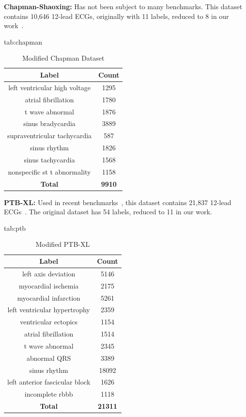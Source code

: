 \documentclass[pmlr,twocolumn]{jmlr}%
\begin{document}
\textbf{Chapman-Shaoxing:} Has not been subject to many benchmarks. This dataset contains 10,646 12-lead ECGs, originally with 11 labels, reduced to 8 in our work~\citep{zheng202012}.
\begin{table}[htbp]
\floatconts
  {tab:chapman}%
  {\caption{Modified Chapman Dataset}}%
  {
    \begin{tabular}{|c|c|}
     \hline
    Label & Count \\
     \hline
    left ventricular high voltage &  1295 \\
    atrial fibrillation           &  1780 \\
    t wave abnormal               &  1876 \\
    sinus bradycardia             &  3889 \\
    supraventricular tachycardia  &   587 \\
    sinus rhythm                  &  1826 \\
    sinus tachycardia             &  1568 \\
    nonspecific st t abnormality  &  1158 \\
     \hline
    \textbf{Total} & \textbf{9910}\\
    \hline
    \end{tabular}
  }
\end{table}

\textbf{PTB-XL:} Used in recent benchmarks~\citep{strodthoff2020deep}, this dataset contains 21,837 12-lead ECGs~\citep{wagner2020ptb}. The original dataset has 54 labels, reduced to 11 in our work. 
\begin{table}[htbp]

\floatconts
  {tab:ptb}%
  {\caption{Modified PTB-XL}}%
  {
    \begin{tabular}{|c|c|}
     \hline
    Label & Count \\
     \hline
        left axis deviation                  &   5146 \\
        myocardial ischemia                  &   2175 \\
        myocardial infarction                &   5261 \\
        left ventricular hypertrophy         &   2359 \\
        ventricular ectopics                 &   1154 \\
        atrial fibrillation                  &   1514 \\
        t wave abnormal                      &   2345 \\
        abnormal QRS                         &   3389 \\
        sinus rhythm                         &  18092 \\
        left anterior fascicular block       &   1626 \\
        incomplete rbbb &   1118 \\
     \hline
    \textbf{Total} & \textbf{21311}\\
    \hline
    \end{tabular}
  }
\end{table}
\end{document}
